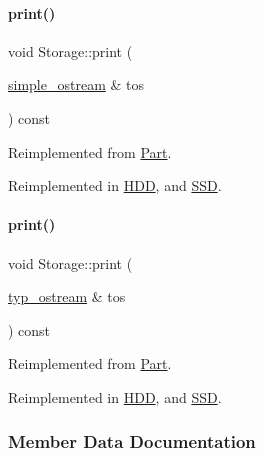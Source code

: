 \mbox{\label{class_storage_a53fc5b4814df41517b9f2be8dcef605e}} 
\paragraph{\texorpdfstring{print()}{print()}\hspace{0.1cm}{\footnotesize\ttfamily [3/4]}}
{\footnotesize\ttfamily void Storage\+::print (\begin{DoxyParamCaption}\item[{\mbox{\hyperlink{structsimple__ostream}{simple\+\_\+ostream}} \&}]{tos }\end{DoxyParamCaption}) const\hspace{0.3cm}{\ttfamily [virtual]}}



Reimplemented from \mbox{\hyperlink{class_part_aa602d876151b63db72cf8f666847a8cd}{Part}}.



Reimplemented in \mbox{\hyperlink{class_h_d_d_a0e48767713740f3ec7dafd907d3570b1}{H\+DD}}, and \mbox{\hyperlink{class_s_s_d_a7efed56d8590399c61d8eefca9295c91}{S\+SD}}.

\mbox{\label{class_storage_ad6c13f251a39612a7628980bf2f12918}} 
\paragraph{\texorpdfstring{print()}{print()}\hspace{0.1cm}{\footnotesize\ttfamily [4/4]}}
{\footnotesize\ttfamily void Storage\+::print (\begin{DoxyParamCaption}\item[{\mbox{\hyperlink{structtyp__ostream}{typ\+\_\+ostream}} \&}]{tos }\end{DoxyParamCaption}) const\hspace{0.3cm}{\ttfamily [virtual]}}



Reimplemented from \mbox{\hyperlink{class_part_ab6396030e8b7a724731a8b54bd4942fc}{Part}}.



Reimplemented in \mbox{\hyperlink{class_h_d_d_a557271f835f56a25fe5c264019f20bb2}{H\+DD}}, and \mbox{\hyperlink{class_s_s_d_a6e252152f8ba75043edec67e19d686e0}{S\+SD}}.



\subsubsection{Member Data Documentation}
\mbox{\label{class_storage_a41073842ff16961dad3903e6dd49bb0c}} 
